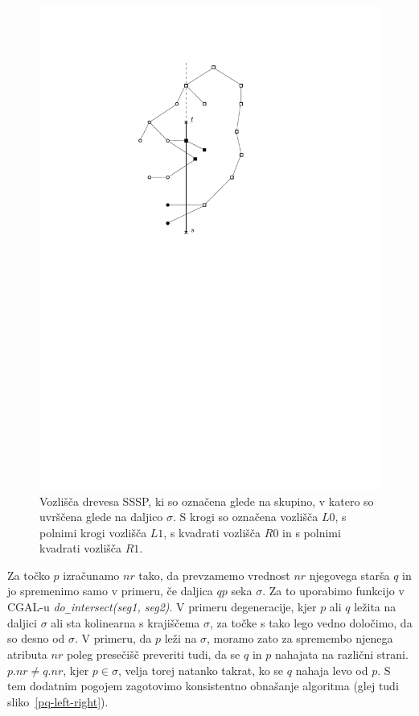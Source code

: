 \documentclass[a4paper, 12pt]{book}
\newcommand{\U}{\texttt{\_}}
\begin{document}
\begin{figure}[htp]
\centerline{\includegraphics{pics/categorization.pdf}}
\caption{Vozlišča drevesa SSSP, ki so označena glede na skupino, v katero so uvrščena glede na daljico $\sigma$. S krogi so označena vozlišča $L0$, s polnimi krogi vozlišča $L1$, s kvadrati vozlišča $R0$ in s polnimi kvadrati vozlišča $R1$. }
\label{categorization}
\end{figure}

Za točko $p$ izračunamo $nr$ tako, da prevzamemo vrednost $nr$ njegovega starša $q$ in jo spremenimo samo v primeru, če daljica $qp$ seka $\sigma$. Za to uporabimo funkcijo v CGAL-u \textit{do\U intersect(seg1, seg2)}. V primeru degeneracije, kjer $p$ ali $q$  ležita na daljici $\sigma$ ali sta kolinearna s krajiščema $\sigma$, za točke s tako lego vedno določimo, da so desno od $\sigma$.  V primeru, da $p$ leži na $\sigma$, moramo zato za spremembo njenega atributa $nr$ poleg presečišč preveriti tudi, da se $q$ in $p$ nahajata na različni strani. $p.nr\neq q.nr$, kjer $p\in \sigma$, velja torej natanko takrat, ko se $q$ nahaja levo od $p$. S tem dodatnim pogojem zagotovimo konsistentno obnašanje algoritma (glej tudi sliko~\ref{pq-left-right}).
\end{document}

